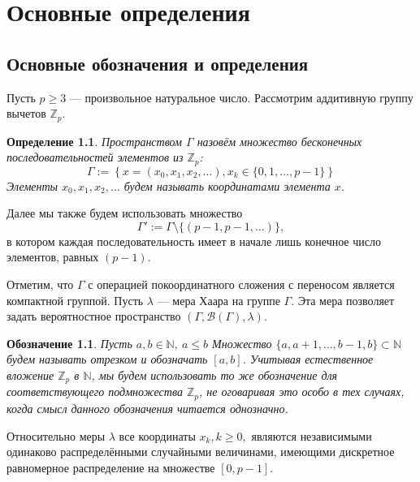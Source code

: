 \documentclass[14pt, a4paper, russian]{report}
\newtheorem{definition}{\indent Определение}
\newtheorem{notation}{\indent Обозначение}
\begin{document}
\newpage

\chapter{Основные определения}

\section{Основные обозначения и определения}

Пусть $p \ge 3$ --- произвольное натуральное число. Рассмотрим аддитивную группу вычетов $\mathbb{Z}_p$. 

\begin{definition}
Пространством $\Gamma$ назовём множество бесконечных последовательностей элементов из $\mathbb{Z}_p$:
$$\Gamma := \left\{x = \left(x_0, x_1, x_2, \ldots \right), x_k \in \{0, 1, \ldots, p - 1\} \right\}$$
Элементы $x_0, x_1, x_2, \ldots$ будем называть координатами элемента $x$.
\end{definition}
Далее мы также будем использовать множество 
$$\Gamma' := \Gamma \setminus \{(p-1,p-1,\ldots)\},$$
в котором каждая последовательность имеет в начале лишь конечное число элементов, равных $(p-1)$.

Отметим, что $\Gamma$ с операцией покоординатного сложения с переносом является компактной группой. Пусть $\lambda$ --- мера Хаара на группе $\Gamma$. Эта мера позволяет задать вероятностное пространство $(\Gamma, \mathcal{B}(\Gamma), \lambda)$.

\begin{notation} 
Пусть $a, b \in \mathbb{N},\ a \le b$ Множество $\{a, a+1, \ldots, b-1, b\} \subset \mathbb{N}$ будем называть отрезком и обозначать $\left[a, b\right]$. Учитывая естественное вложение $\mathbb{Z}_p$ в $\mathbb{N}$, мы будем использовать то же обозначение для соответствующего подмножества $\mathbb{Z}_p$, не оговаривая это особо в тех случаях, когда смысл данного обозначения читается однозначно.
\end{notation}

Относительно меры $\lambda$ все координаты $x_k, k \ge 0,$ являются независимыми одинаково распределёнными случайными величинами, имеющими дискретное равномерное распределение на множестве $\left[0, p-1\right]$. 
\end{document}
